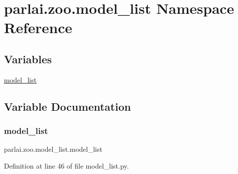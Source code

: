 \hypertarget{namespaceparlai_1_1zoo_1_1model__list}{}\section{parlai.\+zoo.\+model\+\_\+list Namespace Reference}
\label{namespaceparlai_1_1zoo_1_1model__list}
\subsection*{Variables}
\begin{DoxyCompactItemize}
\item 
\hyperlink{namespaceparlai_1_1zoo_1_1model__list_aaff488b6b9827b04668f2bd3ba4aade9}{model\+\_\+list}
\end{DoxyCompactItemize}


\subsection{Variable Documentation}
\mbox{\label{namespaceparlai_1_1zoo_1_1model__list_aaff488b6b9827b04668f2bd3ba4aade9}} 
\subsubsection{\texorpdfstring{model\+\_\+list}{model\_list}}
{\footnotesize\ttfamily parlai.\+zoo.\+model\+\_\+list.\+model\+\_\+list}



Definition at line 46 of file model\+\_\+list.\+py.

